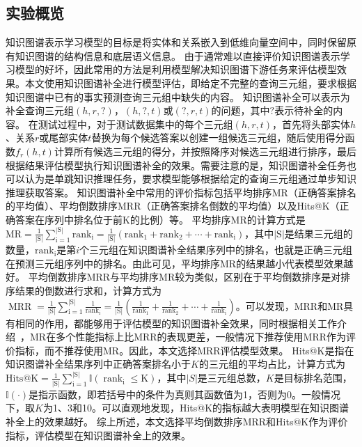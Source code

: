 \documentclass[algorithmlist, AutoFakeBold, AutoFakeSlant, figurelist, tablelist, nomlist, engineering, openany]{seuthesix} %
\begin{document}
\subsection{实验概览}
知识图谱表示学习模型的目标是将实体和关系嵌入到低维向量空间中，同时保留原有知识图谱的结构信息和底层语义信息。
由于通常难以直接评价知识图谱表示学习模型的好坏，因此常用的方法是利用模型解决知识图谱下游任务来评估模型效果。本文使用知识图谱补全进行模型评估，即给定不完整的查询三元组，要求根据知识图谱中已有的事实预测查询三元组中缺失的内容。
知识图谱补全可以表示为补全查询三元组$\left(h, r, ?\right)$，$(h, ?, t)$或$\left(?, r, t\right)$的问题，其中$?$表示待补全的内容。
在测试过程中，对于测试数据集中的每个三元组$(h, r, t)$，首先将头部实体$h$、关系$r$或尾部实体$t$替换为每个候选答案以创建一组候选三元组，随后使用得分函数$f_r\left(h, t\right)$计算所有候选三元组的得分，并按照降序对候选三元组进行排序，最后根据结果评估模型执行知识图谱补全的效果。需要注意的是，知识图谱补全任务也可以认为是单跳知识推理任务，要求模型能够根据给定的查询三元组通过单步知识推理获取答案。
知识图谱补全中常用的评价指标包括平均排序MR（正确答案排名的平均值）、平均倒数排序MRR（正确答案排名倒数的平均值）以及Hits@K（正确答案在序列中排名位于前K的比例）等。
平均排序MR的计算方式是$\mathrm{MR}=\frac{1}{|\mathrm{S}|} \sum_{\mathrm{i}=1}^{|\mathrm{S}|} \mathrm{rank}_{\mathrm{i}}=\frac{1}{|\mathrm{S}|}\left(\mathrm{rank}_1+\mathrm{rank}_2+\cdots+\mathrm{rank}_{\mathrm{i}}\right)$，其中$|\mathrm{S}|$是结果三元组的数量，$\mathrm{rank}_{\mathrm{i}}$是第$i$个三元组在知识图谱补全结果序列中的排名，也就是正确三元组在预测三元组序列中的排名。由此可见，平均排序MR的结果越小代表模型效果越好。
平均倒数排序MRR与平均排序MR较为类似，区别在于平均倒数排序是对排序结果的倒数进行求和，计算方式为$\operatorname{MRR}=\frac{1}{|\mathrm{S}|} \sum_{\mathrm{i}=1}^{|\mathrm{S}|} \frac{1}{\mathrm{rank}_{\mathrm{i}}}=\frac{1}{|\mathrm{S}|}\left(\frac{1}{\mathrm{rank}_1}+\frac{1}{\mathrm{rank}_2}+\cdots+\frac{1}{\mathrm{rank}_{\mathrm{i}}}\right)$。可以发现，MRR和MR具有相同的作用，都能够用于评估模型的知识图谱补全效果，同时根据相关工作介绍~\cite{hoyt2022unified}，MR在多个性能指标上比MRR的表现更差，一般情况下推荐使用MRR作为评价指标，而不推荐使用MR。因此，本文选择MRR评估模型效果。
Hits@K是指在知识图谱补全结果序列中正确答案排名小于$K$的三元组的平均占比，计算方式为$\mathrm{Hits@K}=\frac{1}{|\mathrm{S}|} \sum_{\mathrm{i}=1}^{|\mathrm{S}|} \mathbb{I}\left(\operatorname{rank}_{\mathrm{i}} \leq \mathrm{K}\right)$，其中$|S|$是三元组总数，$K$是目标排名范围，$\mathbb{I}\left(\cdot\right)$是指示函数，即若括号中的条件为真则其函数值为1，否则为0。一般情况下，取$K$为1、3和10。可以直观地发现，Hits@K的指标越大表明模型在知识图谱补全上的效果越好。
综上所述，本文选择平均倒数排序MRR和Hits@K作为评价指标，评估模型在知识图谱补全上的效果。
\end{document}
